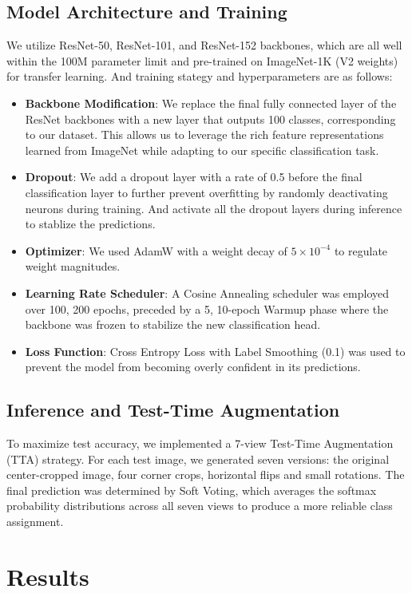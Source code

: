\documentclass[a4paper, twocolumn]{article} %
\begin{document}
\subsection{Model Architecture and Training}
We utilize ResNet-50, ResNet-101, and ResNet-152 backbones, which are all well within the 100M parameter limit and pre-trained on ImageNet-1K (V2 weights) for transfer learning. And training stategy and hyperparameters are as follows:
\begin{itemize}
    \item \textbf{Backbone Modification}: We replace the final fully connected layer of the ResNet backbones with a new layer that outputs 100 classes, corresponding to our dataset. This allows us to leverage the rich feature representations learned from ImageNet while adapting to our specific classification task.
    \item \textbf{Dropout}: We add a dropout layer with a rate of 0.5 before the final classification layer to further prevent overfitting by randomly deactivating neurons during training. And activate all the dropout layers during inference to stablize the predictions.
    \item \textbf{Optimizer}: We used AdamW with a weight decay of $5 \times 10^{-4}$ to regulate weight magnitudes.
    \item \textbf{Learning Rate Scheduler}: A Cosine Annealing scheduler was employed over 100, 200 epochs, preceded by a 5, 10-epoch Warmup phase where the backbone was frozen to stabilize the new classification head.
    \item \textbf{Loss Function}: Cross Entropy Loss with Label Smoothing (0.1) was used to prevent the model from becoming overly confident in its predictions.
\end{itemize}

\subsection{Inference and Test-Time Augmentation}
To maximize test accuracy, we implemented a 7-view Test-Time Augmentation (TTA) strategy. For each test image, we generated seven versions: the original center-cropped image, four corner crops, horizontal flips and small rotations. The final prediction was determined by Soft Voting, which averages the softmax probability distributions across all seven views to produce a more reliable class assignment.


\section{Results}
\end{document}
